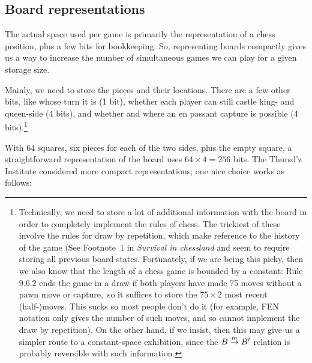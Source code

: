 \documentclass[twocolumn]{amsart}
\begin{document}
\subsection{Board representations} \label{sec:representation}

The actual space used per game is primarily the representation of
a chess position, plus a few bits for bookkeeping. So, representing
boards compactly gives us a way to increase the number of simultaneous
games we can play for a given storage size.

Mainly, we need to store the pieces and their locations. There are a
few other bits, like whose turn it is (1 bit), whether each player can
still castle king- and queen-side (4 bits), and whether and where an
en passant capture is possible (4 bits).\footnote{
%
Technically, we need to store a lot of additional information with the
board in order to completely implement the rules of
chess.\cite{fiderules} The trickiest of these involve the rules for
draw by repetition, which make reference to the history of the game
(See Footnote~1 in {\it Survival in chessland}\cite{survival} and seem
to require storing all previous board states. Fortunately, if we are
being this picky, then we also know that the length of a chess game is
bounded by a constant: Rule 9.6.2 ends the game in a draw if both
players have made 75 moves without a pawn move or
capture,\footnotemark\ so it suffices to store the $75\times 2$ most recent
(half-)moves. This sucks so most people don't do it (for example, FEN
notation only gives the number of such moves, and so cannot implement
the draw by repetition). On the other hand, if we insist, then this
may give us a simpler route to a constant-space exhibition, since the
$B \stackrel{m}{\rightarrow} B'$ relation is probably reversible with such
information.}

With 64 squares, six pieces for each of the two sides, plus the empty
square, a straightforward representation of the board uses $64 \times 4=256$
bits. The Thursd'z Institute considered more compact
representations\cite{representations}; one nice choice works as follows:
\end{document}
